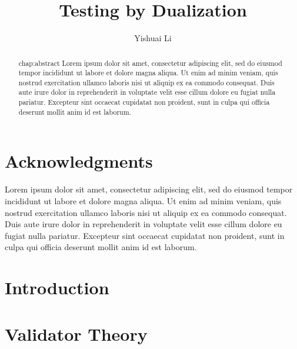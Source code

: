 \documentclass[12pt,oneside]{amsbook}
\title{Testing by Dualization}
\author{Yishuai Li}
\theoremstyle{definition}
\numberwithin{section}{chapter}
\numberwithin{figure}{chapter}
\numberwithin{equation}{chapter}
\numberwithin{definition}{chapter}
\begin{document}
\frontmatter

\maketitle

\copyrightpage

\chapter*{Acknowledgments}
\label{chap:acknowledgments}

Lorem ipsum dolor sit amet, consectetur adipiscing elit, sed do eiusmod tempor
incididunt ut labore et dolore magna aliqua. Ut enim ad minim veniam, quis
nostrud exercitation ullamco laboris nisi ut aliquip ex ea commodo
consequat. Duis aute irure dolor in reprehenderit in voluptate velit esse cillum
dolore eu fugiat nulla pariatur. Excepteur sint occaecat cupidatat non proident,
sunt in culpa qui officia deserunt mollit anim id est laborum.


\begin{abstract}{chap:abstract}
  Lorem ipsum dolor sit amet, consectetur adipiscing elit, sed do eiusmod tempor
  incididunt ut labore et dolore magna aliqua. Ut enim ad minim veniam, quis
  nostrud exercitation ullamco laboris nisi ut aliquip ex ea commodo
  consequat. Duis aute irure dolor in reprehenderit in voluptate velit esse
  cillum dolore eu fugiat nulla pariatur. Excepteur sint occaecat cupidatat non
  proident, sunt in culpa qui officia deserunt mollit anim id est laborum.
\end{abstract}

\tableofcontents
\listoffigures

\mainmatter

\chapter{Introduction}
\label{chap:introduction}


\chapter{Validator Theory}
\label{chap:theory}

\end{document}
